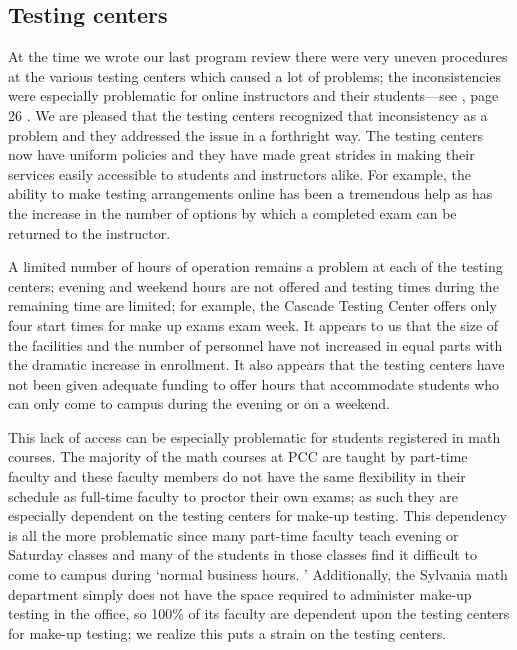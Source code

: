 \subsection{Testing centers} At the time we wrote our last program review there were very uneven procedures at the various testing centers which caused a lot of problems; the inconsistencies were especially problematic for online instructors and their students---see \cite{mathprogramreview2003}, page 26 .
We are pleased that the testing centers recognized that inconsistency as a problem and they addressed the issue in a forthright way.
The testing centers now have uniform policies and they have made great strides in making their services easily accessible to students and instructors alike.
For example, the ability to make testing arrangements online has been a tremendous help as has the increase in the number of options by which a completed exam can be returned to the instructor.

A limited number of hours of operation remains a problem at each of the testing centers;   evening and weekend hours are not offered and testing times during the remaining time are limited; for example, the Cascade Testing Center offers only four start times for make up exams exam week.
It appears to us that the size of  the facilities and the number of personnel  have not increased in equal parts with the dramatic increase in enrollment.
It also appears that the testing centers have not been given adequate funding to offer hours that accommodate students who can only come to campus during the evening or on a weekend.

This lack of access can be especially problematic for students registered in math courses.
The majority of the math courses at PCC are taught by part-time faculty and these faculty members do not have the same flexibility in their schedule as full-time faculty to proctor their own exams; as such they are especially dependent on the testing centers for make-up testing.
This dependency is all the more problematic since many part-time faculty teach evening or Saturday classes and many of the students in those classes find it difficult to come to campus during `normal business hours.
' Additionally, the
Sylvania math department simply does not have the space required to
administer make-up testing in the office, so 100\% of its faculty are dependent
upon the testing centers for make-up testing;   we realize this puts a strain
on the testing centers.


